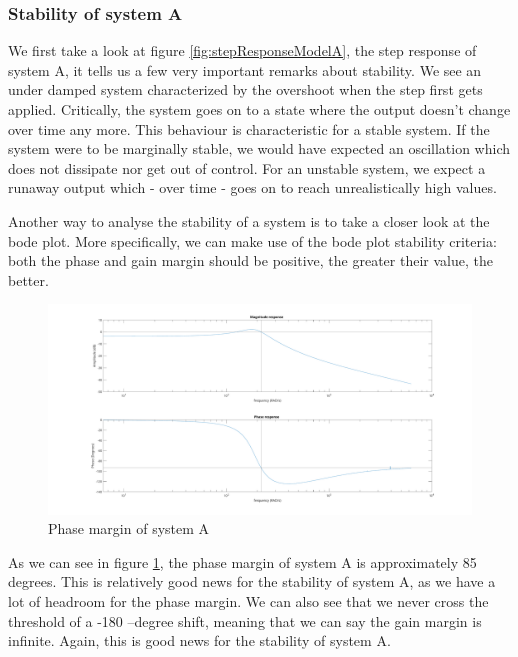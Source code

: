 \documentclass[a4paper,kul]{kulakarticle} %
\begin{document}
			\newpage	
			\subsubsection{Stability of system A}
				\label{sec:StabilitySystemA}
				We first take a look at figure \ref{fig:stepResponseModelA}, the step response of system A, it tells us a few very important remarks about stability. We see an under damped system characterized by the overshoot when the step first gets applied. Critically, the system goes on to a state where the output doesn't change over time any more. This behaviour is characteristic for a stable system. If the system were to be marginally stable, we would have expected an oscillation which does not dissipate nor get out of control. For an unstable system, we expect a runaway output which - over time - goes on to reach unrealistically high values. 
				\newline
				
				Another way to analyse the stability of a system is to take a closer look at the bode plot. More specifically, we can make use of the bode plot stability criteria: both the phase and gain margin should be positive, the greater their value, the better. 
		 		
				\begin{figure}[h]
					\centering
					\includegraphics[width=1\linewidth]{generatedBodeSystemAStability}
					\caption[Phase margin system A]{Phase margin of system A}
					\label{fig:bodePlotModelAStability}
				\end{figure}
				
				As we can see in figure \ref{fig:bodePlotModelAStability}, the phase margin of system A is approximately 85 degrees. This is relatively good news for the stability of system A, as we have a lot of headroom for the phase margin. We can also see that we never cross the threshold of a -180 --degree shift, meaning that we can say the gain margin is infinite. Again, this is good news for the stability of system A.
				
\end{document}
